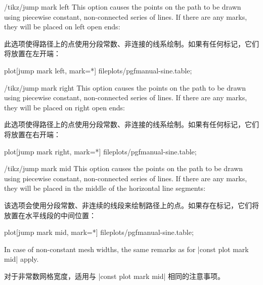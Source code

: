 \begin{key}{/tikz/jump mark left}
    This option causes the points on the path to be drawn using piecewise
    constant, non-connected series of lines. If there are any marks, they will
    be placed on left open ends:
    
    此选项使得路径上的点使用分段常数、非连接的线系绘制。如果有任何标记，它们将放置在左开端：
\begin{codeexample}[]
\tikz\draw plot[jump mark left, mark=*] file{plots/pgfmanual-sine.table};
\end{codeexample}
\end{key}

\begin{key}{/tikz/jump mark right}
    This option causes the points on the path to be drawn using piecewise
    constant, non-connected series of lines. If there are any marks, they will
    be placed on right open ends:
    
    此选项使得路径上的点使用分段常数、非连接的线系绘制。如果有任何标记，它们将放置在右开端：
\begin{codeexample}[]
\tikz\draw plot[jump mark right, mark=*] file{plots/pgfmanual-sine.table};
\end{codeexample}
\end{key}

\begin{key}{/tikz/jump mark mid}
    This option causes the points on the path to be drawn using piecewise
    constant, non-connected series of lines. If there are any marks, they will
    be placed in the middle of the horizontal line segments:
    
    该选项会使用分段常数、非连续的线段来绘制路径上的点。如果存在标记，它们将放置在水平线段的中间位置：

\begin{codeexample}[]
\tikz\draw plot[jump mark mid, mark=*] file{plots/pgfmanual-sine.table};
\end{codeexample}

    In case of non-constant mesh widths, the same remarks as for
    |const plot mark mid| apply.

    对于非常数网格宽度，适用与 |const plot mark mid| 相同的注意事项。

\end{key}

